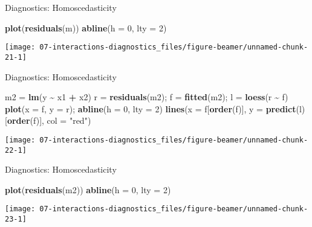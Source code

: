 \documentclass[
  ignorenonframetext,
]{beamer}
\newenvironment{Shaded}{\begin{snugshade}}{\end{snugshade}}
\newcommand{\AttributeTok}[1]{\textcolor[rgb]{0.13,0.29,0.53}{#1}}
\newcommand{\DecValTok}[1]{\textcolor[rgb]{0.00,0.00,0.81}{#1}}
\newcommand{\FunctionTok}[1]{\textcolor[rgb]{0.13,0.29,0.53}{\textbf{#1}}}
\newcommand{\NormalTok}[1]{#1}
\newcommand{\OtherTok}[1]{\textcolor[rgb]{0.56,0.35,0.01}{#1}}
\newcommand{\SpecialCharTok}[1]{\textcolor[rgb]{0.81,0.36,0.00}{\textbf{#1}}}
\newcommand{\StringTok}[1]{\textcolor[rgb]{0.31,0.60,0.02}{#1}}
\begin{document}
\begin{frame}[fragile]{Diagnostics: Homoscedasticity}
\protect\hypertarget{diagnostics-homoscedasticity-1}{}
\begin{Shaded}
\begin{Highlighting}[]
\FunctionTok{plot}\NormalTok{(}\FunctionTok{residuals}\NormalTok{(m))}
\FunctionTok{abline}\NormalTok{(}\AttributeTok{h =} \DecValTok{0}\NormalTok{, }\AttributeTok{lty =} \DecValTok{2}\NormalTok{)}
\end{Highlighting}
\end{Shaded}

\texttt{[image: 07-interactions-diagnostics\_files/figure-beamer/unnamed-chunk-21-1]}
\end{frame}

\begin{frame}[fragile]{Diagnostics: Homoscedasticity}
\protect\hypertarget{diagnostics-homoscedasticity-2}{}
\begin{Shaded}
\begin{Highlighting}[]
\NormalTok{m2 }\OtherTok{=} \FunctionTok{lm}\NormalTok{(y }\SpecialCharTok{\textasciitilde{}}\NormalTok{ x1 }\SpecialCharTok{+}\NormalTok{ x2)}
\NormalTok{r }\OtherTok{=} \FunctionTok{residuals}\NormalTok{(m2); f }\OtherTok{=} \FunctionTok{fitted}\NormalTok{(m2); l }\OtherTok{=} \FunctionTok{loess}\NormalTok{(r }\SpecialCharTok{\textasciitilde{}}\NormalTok{ f)}
\FunctionTok{plot}\NormalTok{(}\AttributeTok{x =}\NormalTok{ f, }\AttributeTok{y =}\NormalTok{ r); }\FunctionTok{abline}\NormalTok{(}\AttributeTok{h =} \DecValTok{0}\NormalTok{, }\AttributeTok{lty =} \DecValTok{2}\NormalTok{)}
\FunctionTok{lines}\NormalTok{(}\AttributeTok{x =}\NormalTok{ f[}\FunctionTok{order}\NormalTok{(f)], }\AttributeTok{y =} \FunctionTok{predict}\NormalTok{(l)[}\FunctionTok{order}\NormalTok{(f)], }\AttributeTok{col =} \StringTok{"red"}\NormalTok{)}
\end{Highlighting}
\end{Shaded}

\texttt{[image: 07-interactions-diagnostics\_files/figure-beamer/unnamed-chunk-22-1]}
\end{frame}

\begin{frame}[fragile]{Diagnostics: Homoscedasticity}
\protect\hypertarget{diagnostics-homoscedasticity-3}{}
\begin{Shaded}
\begin{Highlighting}[]
\FunctionTok{plot}\NormalTok{(}\FunctionTok{residuals}\NormalTok{(m2))}
\FunctionTok{abline}\NormalTok{(}\AttributeTok{h =} \DecValTok{0}\NormalTok{, }\AttributeTok{lty =} \DecValTok{2}\NormalTok{)}
\end{Highlighting}
\end{Shaded}

\texttt{[image: 07-interactions-diagnostics\_files/figure-beamer/unnamed-chunk-23-1]}
\end{frame}
\end{document}
